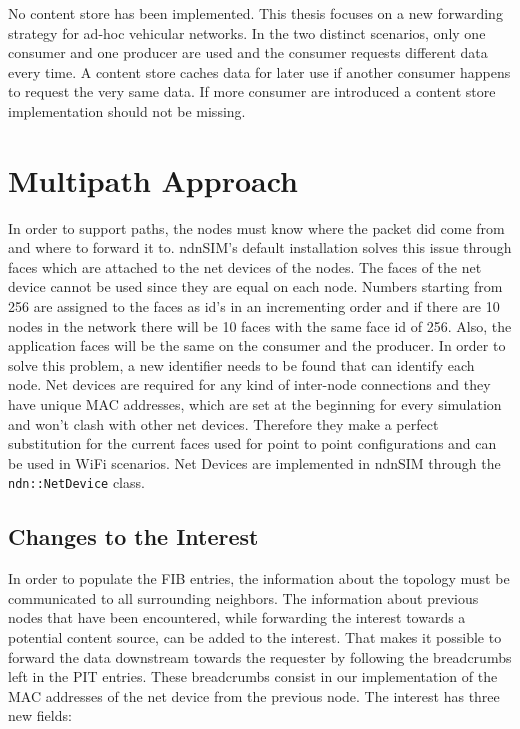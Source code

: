 No content store has been implemented. This thesis focuses on a new forwarding strategy for ad-hoc vehicular networks. In the two distinct scenarios, only one consumer and one producer are used and the consumer requests different data every time. A content store caches data for later use if another consumer happens to request the very same data. If more consumer are introduced a content store implementation should not be missing.


\section{Multipath Approach}

In order to support paths, the nodes must know where the packet did come from and where to forward it to. ndnSIM's default installation solves this issue through faces which are attached to the net devices of the nodes. The faces of the net device cannot be used since they are equal on each node. Numbers starting from 256 are assigned to the faces as id's in an incrementing order and if there are 10 nodes in the network there will be 10 faces with the same face id of 256. Also, the application faces will be the same on the consumer and the producer. In order to solve this problem, a new identifier needs to be found that can identify each node. Net devices are required for any kind of inter-node connections and they have unique MAC addresses, which are set at the beginning for every simulation and won't clash with other net devices. Therefore they make a perfect substitution for the current faces used for point to point configurations and can be used in WiFi scenarios. Net Devices are implemented in ndnSIM through the \texttt{ndn::NetDevice} class.

\subsection{Changes to the Interest}

In order to populate the FIB entries, the information about the topology must be communicated to all surrounding neighbors. The information about previous nodes that have been encountered, while forwarding the interest towards a potential content source, can be added to the interest. That makes it possible to forward the data downstream towards the requester by following the breadcrumbs left in the PIT entries. These breadcrumbs consist in our implementation of the MAC addresses of the net device from the previous node. The interest has three new fields:

